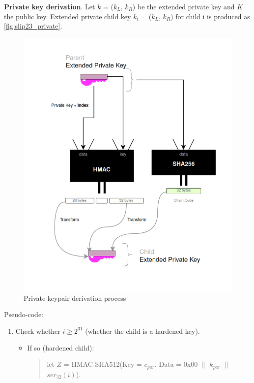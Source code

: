 \begin{adjustwidth}{0.5cm}{}
    \bigskip
    {\textbf{Private key derivation}}. Let $k$ = ($k_L$, $k_R$) be the extended private key and $K$ the public key. Extended private child key $k_i$ = ($k_L $, $k_R$) for child i is produced as \autoref{fig:slip23_private}.
    \begin{figure}[ht!]
        \centering
        \includegraphics[width=1\textwidth]{images/slip23_private.png}
        \caption[Private keypair derivation process]{Private keypair derivation process}
        \label{fig:slip23_private}
    \end{figure}

    Pseudo-code:
    \begin{enumerate}
        \item Check whether $i \geq 2^{31}$ (whether the child is a hardened key).
              \begin{itemize}
                  \item If so (hardened child):
                        \begin{quote}
                            let $Z$ = HMAC-SHA512(Key = $c_{par}$, Data = 0x00 $\parallel$ $k_{par}$ $\parallel$ $ser_{32}(i)$).


\end{quote}
\end{itemize}
\end{enumerate}
\end{adjustwidth}
